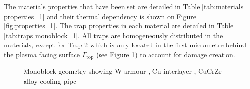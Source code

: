 The materials properties that have been set are detailed in Table \ref{tab:materials properties_1} and their thermal dependency is shown on Figure \ref{fig:properties_1}.
The trap properties in each material are detailed in Table \ref{tab:traps monoblock_1}.
All traps are homogeneously distributed in the materials, except for Trap 2 which is only located in the first micrometre behind the plasma facing surface $\Gamma_\mathrm{top}$ (see Figure \ref{fig: monoblock geometry}) to account for damage creation.


\begin{figure}
     \caption{Monoblock geometry showing W armour \cruleme[grey]{0.3cm}{0.3cm}, Cu interlayer \cruleme[orange]{0.3cm}{0.3cm}, CuCrZr alloy cooling pipe  \cruleme[yellow]{0.3cm}{0.3cm}}\label{fig: monoblock geometry}
\end{figure}


